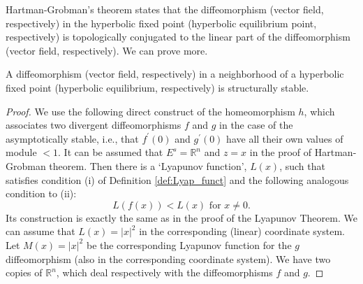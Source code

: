 Hartman-Grobman's theorem states that the diffeomorphism (vector field, respectively) in the hyperbolic fixed point (hyperbolic equilibrium point, respectively) is topologically conjugated to the linear part of the diffeomorphism (vector field, respectively). We can prove more.

\begin{proposition}\label{prop:1.25}
	A diffeomorphism (vector field, respectively) in a neighborhood of a hyperbolic fixed point (hyperbolic equilibrium, respectively) is structurally stable.
	\begin{proof}
		We use the following direct construct of the homeomorphism $ h $, which associates two divergent diffeomorphisms $ f $ and $ g $ in the case of the asymptotically stable, i.e., that $ f ^ {\prime} (0) $ and $ g ^ {\prime} (0) $ have all their own values of module $ <1 $. It can be assumed that $ E ^ {s} = \mathbb {R} ^ {n} $ and $ z = x $ in the proof of Hartman-Grobman theorem. Then there is a `Lyapunov function', $ L (x) $, such that satisfies condition (i) of Definition \ref{def:Lyap_funct} and the following analogous condition to (ii):
		$$
		L(f(x))<L(x)\text{ \ for \ }x\not=0.
		$$
		Its construction is exactly the same as in the proof of the Lyapunov Theorem. We can assume that $ L (x) = \left \vert x \right \vert ^ {2} $ in the corresponding (linear) coordinate system. Let $ M (x) = \left \vert x \right \vert ^ {2} $ be the corresponding Lyapunov function for the $ g $ diffeomorphism (also in the corresponding coordinate system). We have two copies of $ \mathbb {R} ^ {n} $, which deal respectively with the diffeomorphisms $ f $ and $ g $.
		

\end{proof}
\end{proposition}
